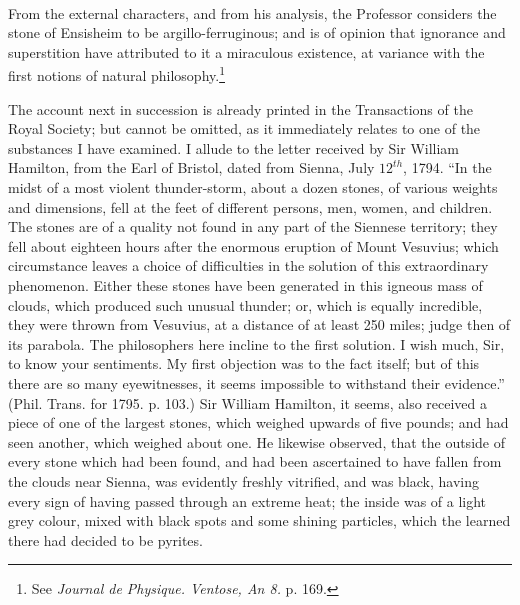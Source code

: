 \documentclass[a4paper, 12pt, oneside, twocolumn]{article}
\begin{document}
\paragraph{}
From the external characters, and from his analysis, the Professor considers the stone of Ensisheim to be argillo-ferruginous; and is of opinion that ignorance and superstition have attributed to it a miraculous existence, at variance with the first notions of natural philosophy.\footnote{See \emph{Journal de Physique. Ventose, An 8.} p. 169.}

The account next in succession is already printed in the Transactions of the Royal Society; but cannot be omitted, as it immediately relates to one of the substances I have examined. I allude to the letter received by Sir William Hamilton, from the Earl of Bristol, dated from Sienna, July $12^{th}$, 1794. ``In the midst of a most violent thunder-storm, about a dozen stones, of various weights and dimensions, fell at the feet of different persons, men, women, and children. The stones are of a quality not found in any part of the Siennese territory; they fell about eighteen hours after the enormous eruption of Mount Vesuvius; which circumstance leaves a choice of difficulties in the solution of this extraordinary phenomenon. Either these stones have been generated in this igneous mass of clouds, which produced such unusual thunder; or, which is equally incredible, they were thrown from Vesuvius, at a distance of at least 250 miles; judge then of its parabola. The philosophers here incline to the first solution. I wish much, Sir, to know your sentiments. My first objection was to the fact itself; but of this there are so many eyewitnesses, it seems impossible to withstand their evidence.'' (Phil. Trans. for 1795. p. 103.) Sir William Hamilton, it seems, also received a piece of one of the largest stones, which weighed upwards of five pounds; and had seen another, which weighed about one. He likewise observed, that the outside of every stone which had been found, and had been ascertained to have fallen from the clouds near Sienna, was evidently freshly vitrified, and was black, having every sign of having passed through an extreme heat; the inside was of a light grey colour, mixed with black spots and some shining particles, which the learned there had decided to be pyrites.
\end{document}
